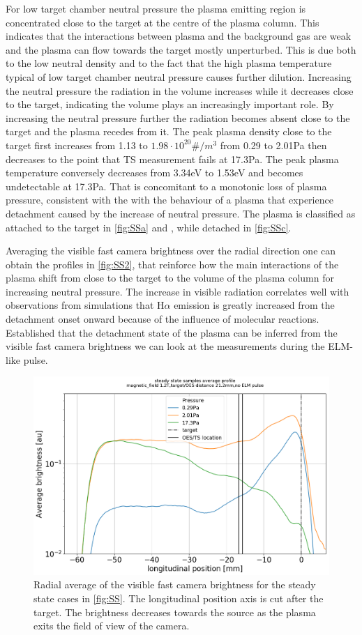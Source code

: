 For low target chamber neutral pressure the plasma emitting region is concentrated close to the target at the centre of the plasma column. This indicates that the interactions between plasma and the background gas are weak and the plasma can flow towards the target mostly unperturbed. This is due both to the low neutral density and to the fact that the high plasma temperature typical of low target chamber neutral pressure causes further dilution. \cite{DenHarder2015} Increasing the neutral pressure the radiation in the volume increases while it decreases close to the target, indicating the volume plays an increasingly important role. By increasing the neutral pressure further the radiation becomes absent close to the target and the plasma recedes from it. The peak plasma density close to the target first increases from 1.13 to $1.98 \cdot 10^{20}\#/m^3$ from 0.29 to 2.01Pa then decreases to the point that TS measurement fails at 17.3Pa. The peak plasma temperature conversely decreases from 3.34eV to 1.53eV and becomes undetectable at 17.3Pa. That is concomitant to a monotonic loss of plasma pressure, consistent with the with the behaviour of a plasma that experience detachment caused by the increase of neutral pressure.\cite{Perillo2019} The plasma is classified as attached to the target in \autoref{fig:SSa} and , while detached in \autoref{fig:SSc}.

Averaging the visible fast camera brightness over the radial direction one can obtain the profiles in \autoref{fig:SS2}, that reinforce how the main interactions of the plasma shift from close to the target to the volume of the plasma column for increasing neutral pressure. The increase in visible radiation correlates well with observations from simulations that H$\alpha$ emission is greatly increased from the detachment onset onward because of the influence of molecular reactions.\cite{Zhou2022} Established that the detachment state of the plasma can be inferred from the visible fast camera brightness we can look at the measurements during the ELM-like pulse.
\begin{figure}[!ht]
	\centering
	\includegraphics[width=0.7\linewidth,trim={7 0 9 45},clip]{Chapters/chapter3/figs/SS_scan4.png}
	\caption{Radial average of the visible fast camera brightness for the steady state cases in \autoref{fig:SS}. The longitudinal position axis is cut after the target. The brightness decreases towards the source as the plasma exits the field of view of the camera.}
	\label{fig:SS2}
\end{figure}


